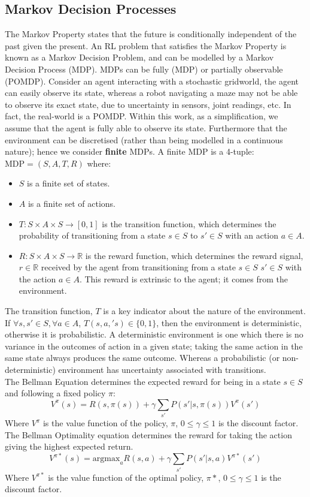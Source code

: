 \subsection{Markov Decision Processes}
The Markov Property states that the future is conditionally independent of the past given the present. An RL problem that satisfies the Markov Property is known as a Markov Decision Problem, and can be modelled by a Markov Decision Process (MDP). MDPs can be fully (MDP) or partially observable (POMDP). Consider an agent interacting with a stochastic gridworld, the agent can easily observe its state, whereas a robot navigating a maze may not be able to observe its exact state, due to uncertainty in sensors, joint readings, etc. In fact, the real-world is a POMDP. Within this work, as a simplification, we assume that the agent is fully able to observe its state. Furthermore that the environment can be discretised (rather than being modelled in a continuous nature); hence we consider \textbf{finite} MDPs.
A finite MDP is a 4-tuple: $\text{MDP} = (S,A,T,R)$ where:
\begin{itemize}
    \item $S$ is a finite set of states.
    \item $A$ is a finite set of actions.
    \item $T : S \times A \times S \rightarrow [0,1]$ is the transition function, which determines the probability of transitioning from a state $s \in S$ to $s' \in S$ with an action $a \in A$.
    \item $R:S \times A \times S \rightarrow \mathbb{R}$ is the reward function, which determines the reward signal, $r \in \mathbb{R}$ received by the agent from transitioning from a state $s \in S$ $s' \in S$ with the action $a \in A$. This reward is extrinsic to the agent; it comes from the environment.
\end{itemize}
The transition function, $T$ is a key indicator about the nature of the environment.
If $\forall s,s' \in S, \forall a \in A$, $T(s,a,'s) \in \{0,1\}$, then the environment is deterministic, otherwise it is probabilistic.
A deterministic environment is one which there is no variance in the outcomes of action in a given state; taking the same action in the same state always produces the same outcome. Whereas a probabilistic (or non-deterministic) environment has uncertainty associated with transitions.
\\The Bellman Equation determines the expected reward for being in a state $s \in S$ and following a fixed policy $\pi$:
$$V^\pi(s) = R(s, \pi(s)) + \gamma \sum_{s'}P(s'|s,\pi(s))V^\pi(s')$$
Where $V^\pi$ is the value function of the policy, $\pi$, $0 \le \gamma \le 1$ is the discount factor.
The Bellman Optimality equation determines the reward for taking the action giving the highest expected return.
$$V^{\pi*}(s) = \text{argmax}_a{R(s,a) + \gamma\sum_{s'}P(s'|s,a)V^{\pi*}(s')}$$
Where $V^{\pi*}$ is the value function of the optimal policy, $\pi*$, $0 \le \gamma \le 1$ is the discount factor.
